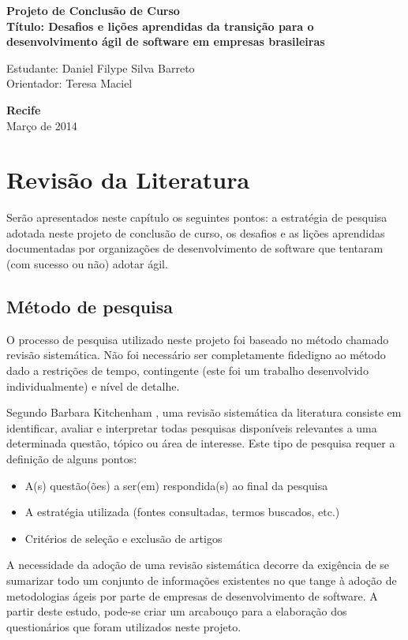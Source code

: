 \documentclass[a4paper,11pt]{article}
\begin{document}
\begin{center}
{\Large \bf  Projeto de Conclusão de Curso}\\[1cm]
{\Large \bf Título: Desafios e lições aprendidas da transição para o desenvolvimento ágil de software em empresas brasileiras} \\[3cm]
\end{center}
{\Large  Estudante: Daniel Filype Silva Barreto}\\[6mm]
{\Large  Orientador: Teresa Maciel}\\[6mm]
\vspace{3.0cm}
\begin{center}
{\large {\bf Recife}\\[6mm]
Março de 2014}
\end{center}
\newpage
\pagestyle {plain}
\setcounter{page}{0} 

\tableofcontents
\newpage

\listoftables
\newpage

\printnomenclature
\newpage

\listoffigures
\newpage

\section{Revisão da Literatura}
	Serão apresentados neste capítulo os seguintes pontos: a estratégia de pesquisa adotada neste projeto de conclusão de curso, os desafios e as lições aprendidas documentadas por organizações de desenvolvimento de software que tentaram (com sucesso ou não) adotar ágil.
	\subsection{Método de pesquisa}
		O processo de pesquisa utilizado neste projeto foi baseado no método chamado revisão sistemática. Não foi necessário ser completamente fidedigno ao método dado a restrições de tempo, contingente (este foi um trabalho desenvolvido individualmente) e nível de detalhe.
		
		Segundo Barbara Kitchenham \cite{Barbara04}, uma revisão sistemática da literatura consiste em identificar, avaliar e interpretar todas pesquisas disponíveis relevantes a uma determinada questão, tópico ou área de interesse. Este tipo de pesquisa requer a definição de alguns pontos:
		\begin{itemize}
			\item A(s) questão(ões) a ser(em) respondida(s) ao final da pesquisa
			\item A estratégia utilizada (fontes consultadas, termos buscados, etc.)
			\item Critérios de seleção e exclusão de artigos
		\end{itemize}
		A necessidade da adoção de uma revisão sistemática decorre da exigência de se sumarizar todo um conjunto de informações existentes no que tange à adoção de metodologias ágeis por parte de empresas de desenvolvimento de software. A partir deste estudo, pode-se criar um arcabouço para a elaboração dos questionários que foram utilizados neste projeto.
\end{document}
